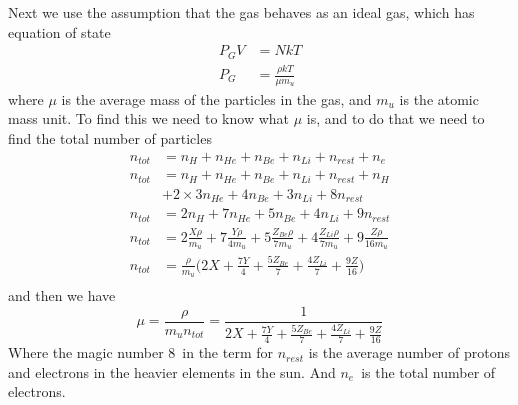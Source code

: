 \documentclass[a4paper,12pt]{article}
\begin{document}
Next we use the assumption that the gas behaves as an ideal gas, which has equation of state
\begin{equation}
\begin{aligned}
P_G V &= NkT\\
P_G   &= \frac{\rho kT}{\mu m_u}
\end{aligned}
\end{equation}
where $\mu$ is the average mass of the particles in the gas, and $m_u$ is the atomic mass unit.
To find this we need to know what $\mu$ is, and to do that we need to find the total number of particles
\begin{equation*}
\begin{aligned}
n_{tot} &= n_H + n_{He} +n_{Be} + n_{Li} + n_{rest}+ n_e\\
n_{tot} &= n_H + n_{He} +n_{Be} + n_{Li} + n_{rest}+ n_H\\
        & + 2\times3n_{He} + 4n_{Be} + 3n_{Li} + 8n_{rest}\\
n_{tot} &= 2n_H + 7n_{He} + 5n_{Be} + 4n_{Li}+ 9n_{rest}\\
n_{tot} &= 2\frac{X\rho}{m_u} + 7\frac{Y\rho}{4m_u} + 5\frac{Z_{Be}\rho}{7m_u} + 4\frac{Z_{Li}\rho}{7m_u} + 9\frac{Z\rho}{16m_u} \\
n_{tot} &= \frac{\rho}{m_u}\bigg(2X + \frac{7Y}{4}+\frac{5Z_{Be}}{7} + \frac{4Z_{Li}}{7}+\frac{9Z}{16}\bigg)\\
\end{aligned}
\end{equation*}
and then we have
\begin{equation}
\mu = \frac{\rho}{m_u n_{tot}} = \frac{1}{2X + \frac{7Y}{4}+\frac{5Z_{Be}}{7} + \frac{4Z_{Li}}{7}+\frac{9Z}{16}}
\end{equation}
Where the magic number $8$ in the term for $n_{rest}$ is the average number of protons and electrons in the heavier elements in the sun.
And $n_e$ is the total number of electrons.
\end{document}
